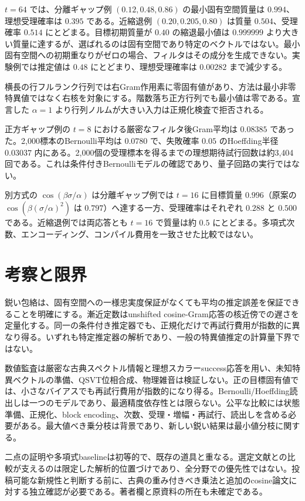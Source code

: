 \documentclass[11pt,a4paper]{article}
\begin{document}
{$t=64$ では、分離ギャップ例 $(0.12,0.48,0.86)$ の最小固有空間質量は $0.994$、理想受理確率は $0.395$ である。近縮退例 $(0.20,0.205,0.80)$ は質量 $0.504$、受理確率 $0.514$ にとどまる。目標初期質量が $0.40$ の縮退最小値は $0.999999$ より大きい質量に達するが、選ばれるのは固有空間であり特定のベクトルではない。最小固有空間への初期重なりがゼロの場合、フィルタはその成分を生成できない。実験例では推定値は $0.48$ にとどまり、理想受理確率は $0.00282$ まで減少する。

横長の行フルランク行列では右Gram作用素に零固有値があり、方法は最小非零特異値ではなく右核を対象にする。階数落ち正方行列でも最小値は零である。宣言した $\alpha=1$ より行列ノルムが大きい入力は正規化検査で拒否される。

正方ギャップ例の $t=8$ における厳密なフィルタ後Gram平均は $0.08385$ であった。2,000標本のBernoulli平均は $0.0780$ で、失敗確率 $0.05$ のHoeffding半径 $0.03037$ 内にある。2,000個の受理標本を得るまでの理想期待試行回数は約3,404回である。これは条件付きBernoulliモデルの確認であり、量子回路の実行ではない。

別方式の $\cos(\beta\sigma/\alpha)$ は分離ギャップ例では $t=16$ に目標質量 $0.996$（原案の $\cos(\beta(\sigma/\alpha)^2)$ は $0.797$）へ達する一方、受理確率はそれぞれ $0.288$ と $0.500$ である。近縮退例では両応答とも $t=16$ で質量は約 $0.5$ にとどまる。多項式次数、エンコーディング、コンパイル費用を一致させた比較ではない。

\section{考察と限界}
鋭い包絡は、固有空間への一様忠実度保証がなくても平均の推定誤差を保証できることを明確にする。漸近定数はunshifted cosine-Gram応答の核近傍での遅さを定量化する。同一の条件付き推定器でも、正規化だけで再試行費用が指数的に異なり得る。いずれも特定推定器の解析であり、一般の特異値推定の計算量下界ではない。

数値監査は厳密な古典スペクトル情報と理想スカラーsuccess応答を用い、未知特異ベクトルの準備、QSVT位相合成、物理雑音は検証しない。正の目標固有値では、小さなバイアスでも再試行費用が指数的になり得る。Bernoulli/Hoeffding読出しは一つのモデルであり、最適精度依存性とは限らない。公平な比較には状態準備、正規化、block encoding、次数、受理・増幅・再試行、読出しを含める必要がある。最大値べき乗分枝は背景であり、新しい鋭い結果は最小値分枝に関する。

二点の証明や多項式baselineは初等的で、既存の道具と重なる。選定文献との比較が支えるのは限定した解析的位置づけであり、全分野での優先性ではない。投稿可能な新規性と判断する前に、古典の重み付きべき乗法と追加のcosine論文に対する独立確認が必要である。著者欄と原資料の所在も未確定である。

}
\end{document}
